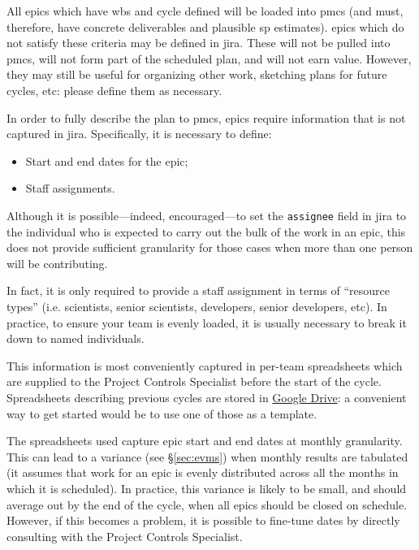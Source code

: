 All \glspl{epic} which have \gls{wbs} and \gls{cycle} defined will be loaded into \gls{pmcs} (and must, therefore, have concrete deliverables and plausible \gls{sp} estimates).
\Glspl{epic} which do not satisfy these criteria may be defined in \gls{jira}.
These will not be pulled into \gls{pmcs}, will not form part of the scheduled plan, and will not earn value.
However, they may still be useful for organizing other work, sketching plans for future \glspl{cycle}, etc: please define them as necessary.

In order to fully describe the plan to \gls{pmcs}, \glspl{epic} require information that is not captured in \gls{jira}.
Specifically, it is necessary to define:

\begin{itemize}
\item
  Start and end dates for the \gls{epic};
\item
  Staff assignments.
\end{itemize}

Although it is possible---indeed, encouraged---to set the \texttt{assignee} field in \gls{jira} to the individual who is expected to carry out the bulk of the work in an \gls{epic}, this does not provide sufficient granularity for those cases when more than one person will be contributing.

In fact, it is only required to provide a staff assignment in terms of ``resource types'' (i.e. scientists, senior scientists, developers, senior developers, etc).
In practice, to ensure your team is evenly loaded, it is usually necessary to break it down to named individuals.

This information is most conveniently captured in per-team spreadsheets which are supplied to the Project Controls Specialist before the start of the \gls{cycle}.
Spreadsheets describing previous \glspl{cycle} are stored in \href{https://drive.google.com/drive/u/0/folders/0BxgFbTQURmr6TmxXSm5Dc1JJWk0}{Google Drive}: a convenient way to get started would be to use one of those as a template.

The spreadsheets used capture \gls{epic} start and end dates at monthly granularity.
This can lead to a variance (see \S\ref{sec:evms}) when monthly results are tabulated (it assumes that work for an \gls{epic} is evenly distributed across all the months in which it is scheduled).
In practice, this variance is likely to be small, and should average out by the end of the \gls{cycle}, when all \glspl{epic} should be closed on schedule.
However, if this becomes a problem, it is possible to fine-tune dates by directly consulting with the Project Controls Specialist.

